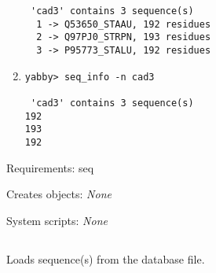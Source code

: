 \begin{description}
\begin{enumerate}
\begin{verbatim}
 'cad3' contains 3 sequence(s)
  1 -> Q53650_STAAU, 192 residues
  2 -> Q97PJ0_STRPN, 193 residues
  3 -> P95773_STALU, 192 residues

\end{verbatim}

\item
\begin{verbatim}
yabby> seq_info -n cad3

 'cad3' contains 3 sequence(s)
192
193
192

\end{verbatim}

\end{enumerate}


\item{Requirements:} seq


\item{Creates objects:} {\em None}


\item{System scripts:} {\em None}

\end{description}



\subsection[seq\_load]{  }



Loads sequence(s) from the database file.


